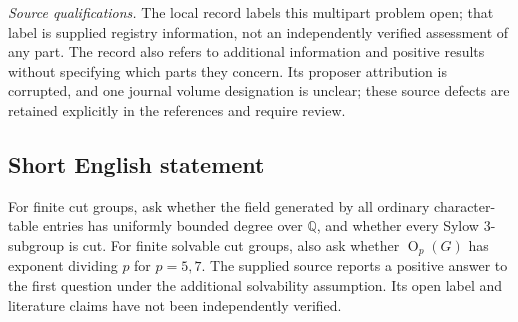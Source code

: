 \documentclass[11pt]{article}
\newcommand{\Q}{\mathbb{Q}}
\begin{document}
\emph{Source qualifications.} The local record labels this multipart problem open; that label is supplied registry information, not an independently verified assessment of any part. The record also refers to additional information and positive results without specifying which parts they concern. Its proposer attribution is corrupted, and one journal volume designation is unclear; these source defects are retained explicitly in the references and require review.
\subsection{Short English statement}
For finite cut groups, ask whether the field generated by all ordinary character-table entries has uniformly bounded degree over \(\Q\), and whether every Sylow \(3\)-subgroup is cut. For finite solvable cut groups, also ask whether \(\operatorname{O}_p(G)\) has exponent dividing \(p\) for \(p=5,7\). The supplied source reports a positive answer to the first question under the additional solvability assumption. Its open label and literature claims have not been independently verified.
\end{document}
